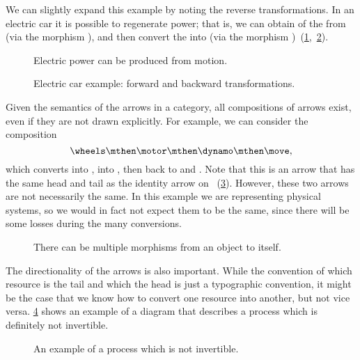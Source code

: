 We can slightly expand this example by noting the reverse transformations. In an electric car
it is possible to regenerate power; that is, we can obtain \rotationalmotion of the \wheels from
\translationalmotion (via the morphism \move), and then convert the \rotationalmotion into \electricpower (via the morphism \dynamo)~(\cref{fig:e6},~\cref{fig:e6-together}).

\begin{figure}[h!]
  \centering
  \caption{Electric power can be produced from motion.}
  \label{fig:e6}
\end{figure}

\begin{figure}[h!]
  \centering
  \caption{Electric car example: forward and backward transformations.\label{fig:e6-together}}
\end{figure}
Given the semantics of the arrows in a category, all compositions of arrows exist, even if they are not drawn
explicitly. For example, we can consider the composition
\begin{equation*}
    \wheels \mthen \motor \mthen \dynamo \mthen \move,
\end{equation*}
which converts \translationalmotion into \rotationalmotion, into \electricpower, then back to
\rotationalmotion and \translationalmotion. Note that this is an arrow that has the same head and tail as the identity arrow on \translationalmotion~(\cref{fig:e8}). However, these two arrows are not necessarily the same. In this example we are representing physical systems, so we would in fact not expect them to be the same, since there will be some losses during the many conversions.

\begin{figure}[h!]
  \centering
  \caption{There can be multiple morphisms from an object to itself.}
  \label{fig:e8}
\end{figure}

The directionality of the arrows is also important. While the convention of
which resource is the tail and which the head is just a typographic convention,
it might be the case that we know how to convert one resource into another, but
not vice versa. \cref{fig:e10} shows an example of a diagram that describes a process which is definitely
not invertible.

\begin{figure}[h!]
  \centering
  \caption{An example of a process which is not invertible. }
  \label{fig:e10}
\end{figure}
